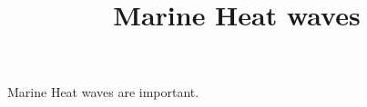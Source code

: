 \documentclass[]{article}
\title{Marine Heat waves}
\begin{document}
\maketitle

Marine Heat waves are important.
\end{document}
